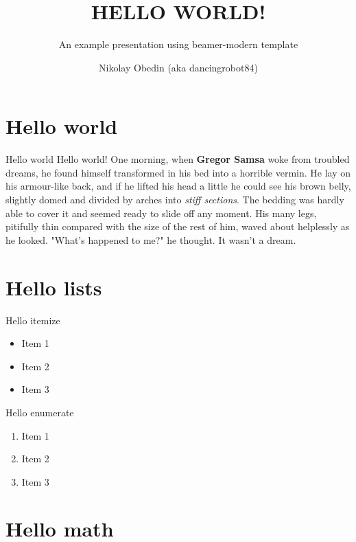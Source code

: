 \documentclass[xetex]{beamer}
\title
    {HELLO WORLD!}
\subtitle
    {An example presentation using beamer-modern template}
\author
    {Nikolay Obedin (aka dancingrobot84)}
\begin{document}
    \frame{\titlepage}

    \frame{\tableofcontents}

    \section{Hello world}

    \begin{frame}{Hello world}
        Hello world! One morning, when \textbf{Gregor Samsa}
        woke from troubled dreams, he found himself
        transformed in his bed into a horrible vermin.
        He lay on his armour-like back, and if he
        lifted his head a little he could see his brown
        belly, slightly domed and divided by arches
        into \textit{stiff sections}. The bedding was hardly
        able to cover it and seemed ready to slide off
        any moment. His many legs, pitifully thin
        compared with the size of the rest of him,
        waved about helplessly as he looked. "What's
        happened to me?" he thought. It wasn't a dream.
    \end{frame}

    \section{Hello lists}

    \begin{frame}{Hello itemize}
        \begin{itemize}
            \item Item 1
            \item Item 2
            \item Item 3
        \end{itemize}
    \end{frame}

    \begin{frame}{Hello enumerate}
        \begin{enumerate}
            \item Item 1
            \item Item 2
            \item Item 3
        \end{enumerate}
    \end{frame}

    \section{Hello math}
\end{document}
